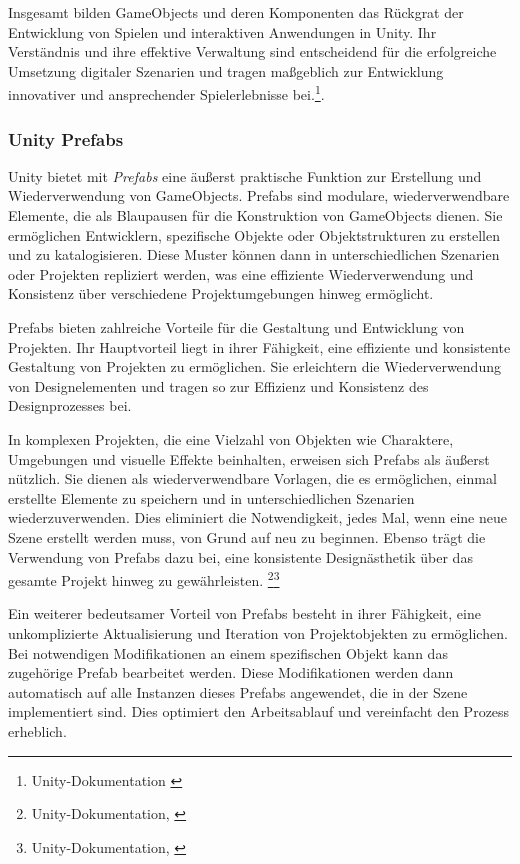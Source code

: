 Insgesamt bilden GameObjects und deren Komponenten das Rückgrat der Entwicklung von Spielen und interaktiven Anwendungen in
Unity. Ihr Verständnis und ihre effektive Verwaltung sind entscheidend für die erfolgreiche Umsetzung digitaler Szenarien
und tragen maßgeblich zur Entwicklung innovativer und ansprechender Spielerlebnisse bei.\footnote{Unity-Dokumentation \cite{GameObjects}}.


\subsubsection{\label{sec:prefabs}Unity Prefabs}

Unity bietet mit \textit{Prefabs} eine äußerst praktische Funktion zur Erstellung und Wiederverwendung von GameObjects. Prefabs sind modulare, wiederverwendbare Elemente, die als Blaupausen für die Konstruktion von GameObjects dienen. Sie ermöglichen Entwicklern, spezifische Objekte oder Objektstrukturen zu erstellen und zu katalogisieren. Diese Muster können dann in unterschiedlichen Szenarien oder Projekten repliziert werden, was eine effiziente Wiederverwendung und Konsistenz über verschiedene Projektumgebungen hinweg ermöglicht.

Prefabs bieten zahlreiche Vorteile für die Gestaltung und Entwicklung von Projekten. Ihr Hauptvorteil liegt in ihrer Fähigkeit, eine effiziente und konsistente Gestaltung von Projekten zu ermöglichen. Sie erleichtern die Wiederverwendung von Designelementen und tragen so zur Effizienz und Konsistenz des Designprozesses bei.

In komplexen Projekten, die eine Vielzahl von Objekten wie Charaktere, Umgebungen und visuelle Effekte beinhalten, erweisen sich Prefabs als äußerst nützlich. Sie dienen als wiederverwendbare Vorlagen, die es ermöglichen, einmal erstellte Elemente zu speichern und in unterschiedlichen Szenarien wiederzuverwenden. Dies eliminiert die Notwendigkeit, jedes Mal, wenn eine neue Szene erstellt werden muss, von Grund auf neu zu beginnen. Ebenso trägt die Verwendung
von Prefabs dazu bei, eine konsistente Designästhetik über das gesamte Projekt hinweg zu gewährleisten. \footnote{Unity-Dokumentation, \cite{Prefabs}}\footnote{Unity-Dokumentation, \cite{Prefabs-2}}


Ein weiterer bedeutsamer Vorteil von Prefabs besteht in ihrer Fähigkeit, eine unkomplizierte Aktualisierung und Iteration von Projektobjekten zu ermöglichen. Bei notwendigen Modifikationen an einem spezifischen Objekt kann das zugehörige Prefab bearbeitet werden. Diese Modifikationen werden dann automatisch auf alle Instanzen dieses Prefabs angewendet, die in der Szene implementiert sind. Dies optimiert den Arbeitsablauf und vereinfacht den Prozess erheblich.

